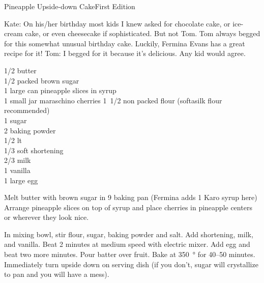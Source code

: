 \begin{entry}{Pineapple Upside-down Cake}{First Edition}

\begin{open}
  Kate: On his/her birthday most kids I knew asked for chocolate cake, or
  ice-cream cake, or even cheesecake if sophisticated. But not Tom.  Tom always
  begged for this somewhat unusual birthday cake. Luckily, Fermina Evans has a
  great recipe for it!  Tom: I begged for it because it's delicious. Any kid
  would agree.
\end{open}
\begin{ingredients}
  \SI{1/2}{\cup} butter \\
  \SI{1/2}{\cup} packed brown sugar \\
  1 large can pineapple slices in syrup \\
  1 small jar maraschino cherries
  \SI{1/2}[1]{\cup} non packed flour (softasilk flour recommended) \\
  \SI{1}{\cup} sugar \\
  \SI{2}{\teaspoon} baking powder \\
  \SI{1/2}{\teaspoon} lt \\
  \SI{1/3}{\cup} soft shortening \\
  \SI{2/3}{\cup} milk \\
  \SI{1}{\teaspoon} vanilla \\
  1 large egg
\end{ingredients}
Melt butter with brown sugar in \SI{9}{\inch} baking pan (Fermina adds
\SI{1}{\tblspoon} Karo syrup here) Arrange pineapple slices on top of syrup
and place cherries in pineapple centers or wherever they look nice.

In mixing bowl, stir flour, sugar, baking powder and salt. Add shortening,
milk, and vanilla. Beat 2 minutes at medium speed with electric mixer. Add egg
and beat two more minutes. Pour batter over fruit. Bake at \SI{350}{\degree}
for \numrange{40}{50} minutes. Immediately turn upside down on serving dish
(if you don't, sugar will crystallize to pan and you will have a mess).
\end{entry}

